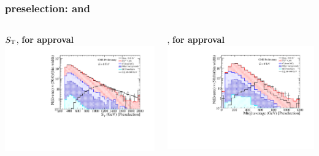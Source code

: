 \documentclass[bigger]{beamer}
\providecommand{\alert}[1]{\textbf{#1}}
\begin{document}
\begin{frame}
\frametitle{\eejj preselection: \ST and \mej}
\label{sec-2-1-3}
\begin{columns}
\begin{column}{0.6\textwidth}
\label{sec-2-1-3-1}

\centering
$S_{\text{T}}$, \alert{for approval}
\includegraphics[width=\textwidth]{fig/ee/preselection_noRatio/sT_PAS_eejj.pdf}
\end{column}
\begin{column}{0.6\textwidth}
\label{sec-2-1-3-2}

\centering
\mej, \alert{for approval}
\includegraphics[width=\textwidth]{fig/ee/preselection_noRatio/Mej_selected_avg_PAS_eejj.pdf}
\end{column}
\end{columns}
\end{frame}
\end{document}

